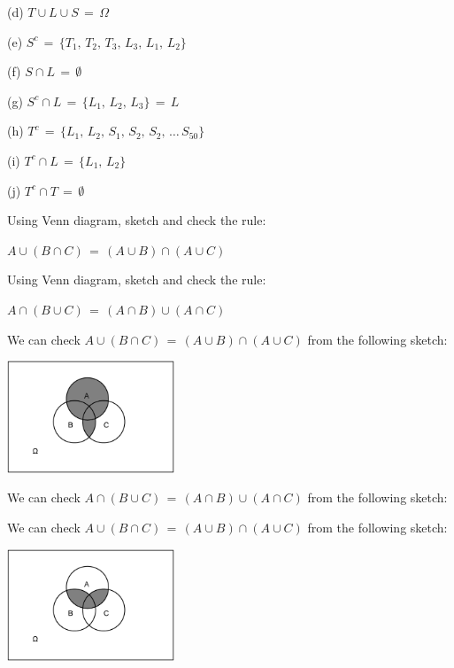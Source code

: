 \begin{ExerciseList}
{\item[(d)] $T \cup L \cup S\,=\, \Omega$

\item[(e)] $S^c \,=\,\{ T_1,\,T_2,\, T_3,\, L_3,\, L_1,\, L_2\} $

\item[(f)] $S \cap L\,=\, \emptyset$

\item[(g)] $S^c\cap L\,=\,\{L_1,\, L_2,\,L_3\}\,=\, L $

\item[(h)] $T^c\,=\,\{L_1,\, L_2,\,S_1,\, S_2,\, S_2,\,\dots \, S_{50}\}  $

\item[(i)] $T^c \cap L\,=\,\{L_1,\, L_2\} $


\item[(j)] $T^c\cap T\,=\, \emptyset$

\ee\ecols
}

\Exercise
Using Venn diagram, sketch and check the rule:

$A\cup(B\cap C)\,=\,(A\cup B)\cap (A\cup C)$

\Exercise
Using Venn diagram, sketch and check the rule:

$A\cap(B\cup C)\,=\,(A\cap B)\cup(A\cap C)$

\Answer
We can check $A\cup(B\cap C)\,=\,(A\cup B)\cap (A\cup C)$ from the following sketch:

\begin{center}
{\includegraphics[width=5cm]{figures/ABC1}}
\end{center}

\Answer
We can check $A\cap(B\cup C)\,=\,(A\cap B)\cup(A\cap C)$ from the following sketch:

We can check $A\cup(B\cap C)\,=\,(A\cup B)\cap (A\cup C)$ from the following sketch:
\begin{center}
{\includegraphics[width=5cm]{figures/ABC2}}
\end{center}


\end{ExerciseList}
